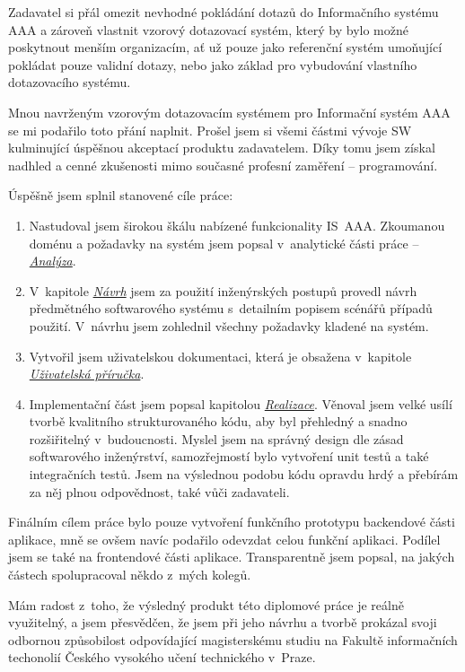 \documentclass[thesis=M,czech]{FITthesis}[2019/12/23]
\begin{document}
\begin{conclusion}
Zadavatel si přál omezit nevhodné pokládání dotazů do Informačního systému AAA a zároveň vlastnit vzorový dotazovací systém, který by bylo možné poskytnout menším organizacím, ať už pouze jako referenční systém umoňující pokládat pouze validní dotazy, nebo jako základ pro vybudování vlastního dotazovacího systému.

Mnou navrženým vzorovým dotazovacím systémem pro Informační systém AAA se mi podařilo toto přání naplnit. Prošel jsem si všemi částmi vývoje SW kulminující úspěšnou akceptací produktu zadavatelem. Díky tomu jsem získal nadhled a cenné zkušenosti mimo současné profesní zaměření -- programování.

Úspěšně jsem splnil stanovené cíle práce:
\begin{enumerate}
	\item Nastudoval jsem širokou škálu nabízené funkcionality IS~AAA. Zkoumanou doménu a požadavky na systém jsem popsal v~analytické části práce -- \hyperref[Analyza]{\textit{Analýza}}.
	\item V~kapitole \hyperref[Navrh]{\textit{Návrh}} jsem za použití inženýrských postupů provedl návrh předmětného softwarového systému s~detailním popisem scénářů případů použití. V~návrhu jsem zohlednil všechny požadavky kladené na systém.
	\item Vytvořil jsem uživatelskou dokumentaci, která je obsažena v~kapitole\\ \hyperref[UzivatelskaPrirucka]{\textit{Uživatelská příručka}}.
	\item Implementační část jsem popsal kapitolou \hyperref[Realizace]{\textit{Realizace}}. Věnoval jsem velké usílí tvorbě kvalitního strukturovaného kódu, aby byl přehledný a snadno rozšiřitelný v~budoucnosti. Myslel jsem na správný design dle zásad softwarového inženýrství, samozřejmostí bylo vytvoření unit testů a také integračních testů. Jsem na výslednou podobu kódu opravdu hrdý a přebírám za něj plnou odpovědnost, také vůči zadavateli.
\end{enumerate}

\newpage 
Finálním cílem práce bylo pouze vytvoření funkčního prototypu backendové části aplikace, mně se ovšem navíc podařilo odevzdat celou funkční aplikaci. Podílel jsem se také na frontendové části aplikace. Transparentně jsem popsal, na jakých částech spolupracoval někdo z~mých kolegů. 

Mám radost z~toho, že výsledný produkt této diplomové práce je reálně využitelný, a jsem přesvědčen, že jsem při jeho návrhu a tvorbě prokázal svoji odbornou způsobilost odpovídající magisterskému studiu na Fakultě informačních techonolií Českého vysokého učení technického v~Praze. 
\end{conclusion}
\end{document}
